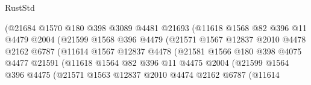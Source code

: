 \begin{lexlean}{RustStd}
\begin{coremodule}
{\begin{coremodule}
{{{{{{{{{{{{{{{{{{{{{{{{{{{{{{{                                (@21684
                                  @1570
                                  @180
                                  @398
                                  @3089
                                  @4481
                                  @21693
                                  (@11618
                                    @1568
                                    @82
                                    @396
                                    @11
                                    @4479
                                    @2004
                                    (@21599
                                      @1568
                                      @396
                                      @4479
                                      (@21571
                                        @1567
                                        @12837
                                        @2010
                                        @4478
                                        @2162
                                        @6787
                                        (@11614
                                          @1567
                                          @12837
                                          @4478
                                          (@21581
                                            @1566
                                            @180
                                            @398
                                            @4075
                                            @4477
                                            @21591
                                            (@11618
                                              @1564
                                              @82
                                              @396
                                              @11
                                              @4475
                                              @2004
                                              (@21599
                                                @1564
                                                @396
                                                @4475
                                                (@21571
                                                  @1563
                                                  @12837
                                                  @2010
                                                  @4474
                                                  @2162
                                                  @6787
                                                  (@11614
}}}}}}}}}}}}}}}}}}}}}}}}}}}}}}}
\end{coremodule}}
\end{coremodule}
\end{lexlean}
